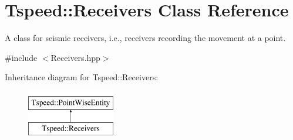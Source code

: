 \hypertarget{classTspeed_1_1Receivers}{\section{Tspeed\-:\-:Receivers Class Reference}
\label{classTspeed_1_1Receivers}
}


A class for seismic receivers, i.\-e., receivers recording the movement at a point.  




{\ttfamily \#include $<$Receivers.\-hpp$>$}

Inheritance diagram for Tspeed\-:\-:Receivers\-:\begin{figure}[H]
\begin{center}
\leavevmode
\includegraphics[height=2.000000cm]{classTspeed_1_1Receivers}
\end{center}
\end{figure}
